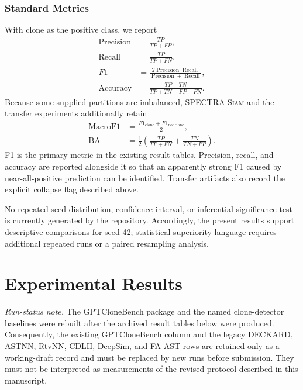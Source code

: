\documentclass[authoryear,final,5p,times,twocolumn]{elsarticle}
\newcommand{\method}{\textsc{SPECTRA-Siam}}
\newcommand{\added}[1]{{\color{green!50!black}#1}}
\theoremstyle{plain}
\begin{document}
\subsubsection{Standard Metrics}

With clone as the positive class, we report
\begin{align}
\operatorname{Precision}
&=\frac{TP}{TP+FP},\\
\operatorname{Recall}
&=\frac{TP}{TP+FN},\\
F1
&=\frac{2\operatorname{Precision}\operatorname{Recall}}
{\operatorname{Precision}+\operatorname{Recall}},\\
\operatorname{Accuracy}
&=\frac{TP+TN}{TP+TN+FP+FN}.
\end{align}
Because some supplied partitions are imbalanced, \method{} and the transfer
experiments additionally retain
\begin{align}
\operatorname{MacroF1}
&=\frac{F1_{\mathrm{clone}}+F1_{\mathrm{nonclone}}}{2},\\
\operatorname{BA}
&=\frac{1}{2}\left(
\frac{TP}{TP+FN}+\frac{TN}{TN+FP}\right).
\end{align}
F1 is the primary metric in the existing result tables. Precision, recall, and
accuracy are reported alongside it so that an apparently strong F1 caused by
near-all-positive prediction can be identified. \added{Transfer artifacts also
record the explicit collapse flag described above.}

\added{No repeated-seed distribution, confidence interval, or inferential
significance test is currently generated by the repository. Accordingly, the
present results support descriptive comparisons for seed 42;
statistical-superiority language requires additional repeated runs or a paired
resampling analysis.}

\section{Experimental Results}
\label{sec:exp_results}

\added{\textit{Run-status note.} The GPTCloneBench package and the named
clone-detector baselines were rebuilt after the archived result tables below
were produced. Consequently, the existing GPTCloneBench column and the legacy
DECKARD, ASTNN, RtvNN, CDLH, DeepSim, and FA-AST rows are retained only as a
working-draft record and must be replaced by new runs before submission. They
must not be interpreted as measurements of the revised protocol described in
this manuscript.}
\end{document}
